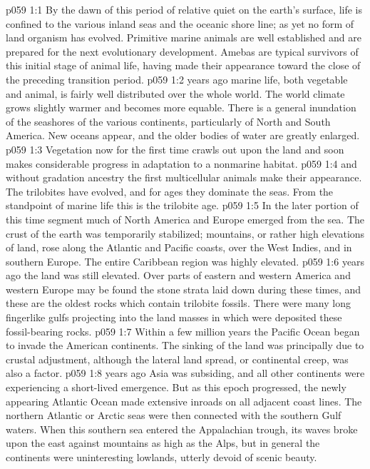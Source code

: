 \vs p059 1:1 By the dawn of this period of relative quiet on the earth’s surface, life is confined to the various inland seas and the oceanic shore line; as yet no form of land organism has evolved. Primitive marine animals are well established and are prepared for the next evolutionary development. Amebas are typical survivors of this initial stage of animal life, having made their appearance toward the close of the preceding transition period.
\pc \vs p059 1:2  years ago marine life, both vegetable and animal, is fairly well distributed over the whole world. The world climate grows slightly warmer and becomes more equable. There is a general inundation of the seashores of the various continents, particularly of North and South America. New oceans appear, and the older bodies of water are greatly enlarged.
\vs p059 1:3 Vegetation now for the first time crawls out upon the land and soon makes considerable progress in adaptation to a nonmarine habitat.
\vs p059 1:4  and without gradation ancestry the first multicellular animals make their appearance. The trilobites have evolved, and for ages they dominate the seas. From the standpoint of marine life this is the trilobite age.
\vs p059 1:5 In the later portion of this time segment much of North America and Europe emerged from the sea. The crust of the earth was temporarily stabilized; mountains, or rather high elevations of land, rose along the Atlantic and Pacific coasts, over the West Indies, and in southern Europe. The entire Caribbean region was highly elevated.
\pc \vs p059 1:6  years ago the land was still elevated. Over parts of eastern and western America and western Europe may be found the stone strata laid down during these times, and these are the oldest rocks which contain trilobite fossils. There were many long fingerlike gulfs projecting into the land masses in which were deposited these fossil\hyp{}bearing rocks.
\vs p059 1:7 Within a few million years the Pacific Ocean began to invade the American continents. The sinking of the land was principally due to crustal adjustment, although the lateral land spread, or continental creep, was also a factor.
\pc \vs p059 1:8  years ago Asia was subsiding, and all other continents were experiencing a short\hyp{}lived emergence. But as this epoch progressed, the newly appearing Atlantic Ocean made extensive inroads on all adjacent coast lines. The northern Atlantic or Arctic seas were then connected with the southern Gulf waters. When this southern sea entered the Appalachian trough, its waves broke upon the east against mountains as high as the Alps, but in general the continents were uninteresting lowlands, utterly devoid of scenic beauty.
